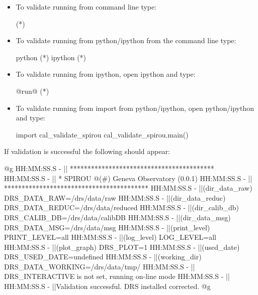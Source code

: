 \begin{itemize}

\item To validate running from command line type:
\begin{cmdbox}
(*\calvalidate*)
\end{cmdbox}

\item To validate running from python/ipython from the command line type:
\begin{cmdbox}
python (*\calvalidate*)
ipython (*\calvalidate*)
\end{cmdbox}

\item To validate running from ipython, open ipython and type:
\begin{pythonbox}
@run@ (*\calvalidate*)
\end{pythonbox}

\item To validate running from import from python/ipython, open python/ipython and type:
\begin{pythonbox}
import cal_validate_spirou
cal_validate_spirou.main()
\end{pythonbox}

\end{itemize}

\noindent If validation is successful the following should appear:

\begin{cmdboxprintspecial}
@g
HH:MM:SS.S -   || *****************************************
HH:MM:SS.S -   || * SPIROU @(#) Geneva Observatory (0.0.1)
HH:MM:SS.S -   || *****************************************
HH:MM:SS.S -   ||(dir_data_raw)      DRS_DATA_RAW=/drs/data/raw
HH:MM:SS.S -   ||(dir_data_reduc)    DRS_DATA_REDUC=/drs/data/reduced
HH:MM:SS.S -   ||(dir_calib_db)      DRS_CALIB_DB=/drs/data/calibDB
HH:MM:SS.S -   ||(dir_data_msg)      DRS_DATA_MSG=/drs/data/msg
HH:MM:SS.S -   ||(print_level)       PRINT_LEVEL=all         %
HH:MM:SS.S -   ||(log_level)         LOG_LEVEL=all         %
HH:MM:SS.S -   ||(plot_graph)        DRS_PLOT=1            %
HH:MM:SS.S -   ||(used_date)         DRS_USED_DATE=undefined
HH:MM:SS.S -   ||(working_dir)       DRS_DATA_WORKING=/drs/data/tmp/
HH:MM:SS.S -   ||                    DRS_INTERACTIVE is not set, running on-line mode
HH:MM:SS.S -   ||
HH:MM:SS.S -   ||Validation successful. DRS installed corrected.
@g
\end{cmdboxprintspecial}

